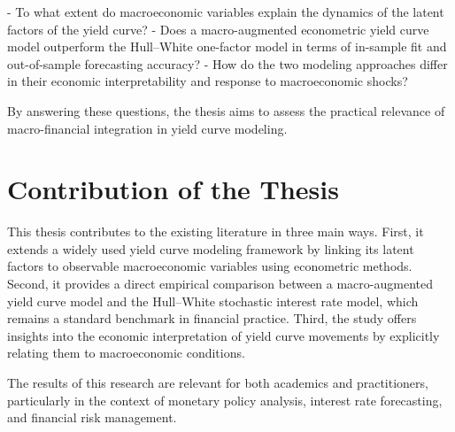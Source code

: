 - To what extent do macroeconomic variables explain the dynamics of the latent factors of the yield curve?
- Does a macro-augmented econometric yield curve model outperform the Hull–White one-factor model in terms of in-sample fit and out-of-sample forecasting accuracy?
- How do the two modeling approaches differ in their economic interpretability and response to macroeconomic shocks?

By answering these questions, the thesis aims to assess the practical relevance of macro-financial integration in yield curve modeling.


\section{Contribution of the Thesis}
This thesis contributes to the existing literature in three main ways. First, it extends a widely used yield curve modeling framework by linking its latent factors to observable macroeconomic variables using econometric methods. Second, it provides a direct empirical comparison between a macro-augmented yield curve model and the Hull–White stochastic interest rate model, which remains a standard benchmark in financial practice. Third, the study offers insights into the economic interpretation of yield curve movements by explicitly relating them to macroeconomic conditions.

The results of this research are relevant for both academics and practitioners, particularly in the context of monetary policy analysis, interest rate forecasting, and financial risk management.

